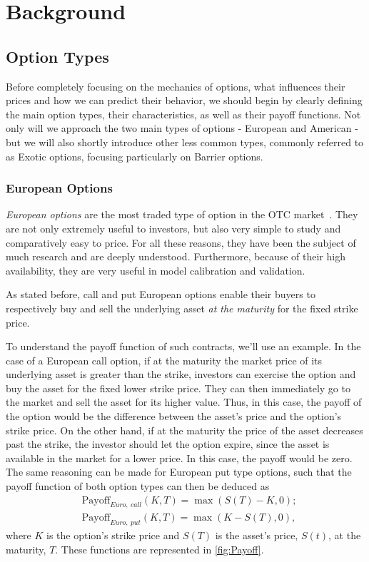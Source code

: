 \chapter{Background}
\label{chapter:background}
\section{Option Types}
Before completely focusing on the mechanics of options, what influences their prices and how we can predict their behavior, we should begin by clearly defining the main option types, their characteristics, as well as their payoff functions. Not only will we approach the two main types of options - European and American - but we will also shortly introduce other less common types, commonly referred to as Exotic options, focusing particularly on Barrier options.



\subsection{European Options}
\emph{European options} are the most traded type of option in the OTC market~\cite{InvEuro}. They are not only extremely useful to investors, but also very simple to study and comparatively easy to price. For all these reasons, they have been the subject of much research and are deeply understood. Furthermore, because of their high availability, they are very useful in model calibration and validation.


As stated before, call and put European options enable their buyers to respectively buy and sell the underlying asset \emph{at the maturity} for the fixed strike price.

To understand the payoff function of such contracts, we'll use an example. In the case of a European call option, if at the maturity the market price of its underlying asset is greater than the strike, investors can exercise the option and buy the asset for the fixed lower strike price. They can then immediately go to the market and sell the asset for its higher value. Thus, in this case, the payoff of the option would be the difference between the asset's price and the option's strike price. On the other hand, if at the maturity the price of the asset decreases past the strike, the investor should let the option expire, since the asset is available in the market for a lower price. In this case, the payoff would be zero.
The same reasoning can be made for European put type options, such that the payoff function of both option types can then be deduced as
\begin{equation}\label{callput}
\begin{split}
&\text{Payoff}_{Euro,\ call}(K,T)=\max\left(S(T)-K,0\right);\\
&\text{Payoff}_{Euro,\ put}(K,T)=\max\left(K-S(T),0\right),
\end{split}
\end{equation}
\noindent where $K$ is the option's strike price and $S(T)$ is the asset's price, $S(t)$, at the maturity, $T$. These functions are represented in \autoref{fig:Payoff}.


